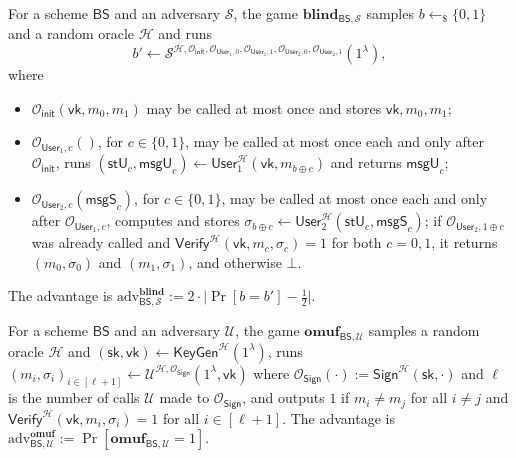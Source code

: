 \documentclass{conjura-conjecture}
\newcommand{\HH}{\mathcal{H}}
\newcommand{\BS}{\mathsf{BS}}
\newcommand{\KeyGen}{\mathsf{KeyGen}}
\newcommand{\Userone}{\mathsf{User}_1}
\newcommand{\Usertwo}{\mathsf{User}_2}
\newcommand{\Sig}{\mathsf{Sign}}
\newcommand{\Ver}{\mathsf{Verify}}
\newcommand{\sky}{\mathsf{sk}}
\newcommand{\vky}{\mathsf{vk}}
\newcommand{\stU}{\mathsf{stU}}
\newcommand{\msgU}{\mathsf{msgU}}
\newcommand{\msgS}{\mathsf{msgS}}
\newcommand{\OSign}{\mathcal{O}_{\mathsf{Sign}}}
\newcommand{\Oinit}{\mathcal{O}_{\mathsf{init}}}
\newcommand{\adv}{\mathrm{adv}}
\begin{document}
\begin{definition}[Blindness]\label{def:blind}
For a scheme $\BS$ and an adversary $\mathcal{S}$, the game
$\mathbf{blind}_{\BS,\mathcal{S}}$ samples $b\leftarrow_{\$}\{0,1\}$ and
a random oracle $\HH$ and runs
\[
  b'\leftarrow\mathcal{S}^{\HH,\Oinit,\mathcal{O}_{\Userone,0},
  \mathcal{O}_{\Userone,1},\mathcal{O}_{\Usertwo,0},
  \mathcal{O}_{\Usertwo,1}}(1^{\lambda}),
\]
where
\begin{itemize}
  \item $\Oinit(\vky,m_{0},m_{1})$ may be called at most once and stores
    $\vky,m_{0},m_{1}$;
  \item $\mathcal{O}_{\Userone,c}()$, for $c\in\{0,1\}$, may be called at
    most once each and only after $\Oinit$, runs
    $(\stU_{c},\msgU_{c})\leftarrow\Userone^{\HH}(\vky,m_{b\oplus c})$
    and returns $\msgU_{c}$;
  \item $\mathcal{O}_{\Usertwo,c}(\msgS_{c})$, for $c\in\{0,1\}$, may be
    called at most once each and only after $\mathcal{O}_{\Userone,c}$,
    computes and stores
    $\sigma_{b\oplus c}\leftarrow\Usertwo^{\HH}(\stU_{c},\msgS_{c})$; if
    $\mathcal{O}_{\Usertwo,1\oplus c}$ was already called and
    $\Ver^{\HH}(\vky,m_{c},\sigma_{c})=1$ for both $c=0,1$, it returns
    $(m_{0},\sigma_{0})$ and $(m_{1},\sigma_{1})$, and otherwise $\bot$.
\end{itemize}
The advantage is
$\adv^{\mathbf{blind}}_{\BS,\mathcal{S}}
 :=2\cdot\bigl|\Pr[b=b']-\tfrac{1}{2}\bigr|$.
\end{definition}

\begin{definition}\label{def:omuf}
For a scheme $\BS$ and an adversary $\mathcal{U}$, the game
$\mathbf{omuf}_{\BS,\mathcal{U}}$ samples a random oracle $\HH$ and
$(\sky,\vky)\leftarrow\KeyGen^{\HH}(1^{\lambda})$, runs
$(m_{i},\sigma_{i})_{i\in[\ell+1]}\leftarrow
\mathcal{U}^{\HH,\OSign}(1^{\lambda},\vky)$ where
$\OSign(\cdot):=\Sig^{\HH}(\sky,\cdot)$ and $\ell$ is the number of
calls $\mathcal{U}$ made to $\OSign$, and outputs $1$ if
$m_{i}\ne m_{j}$ for all $i\ne j$ and
$\Ver^{\HH}(\vky,m_{i},\sigma_{i})=1$ for all $i\in[\ell+1]$. The
advantage is
$\adv^{\mathbf{omuf}}_{\BS,\mathcal{U}}
 :=\Pr[\mathbf{omuf}_{\BS,\mathcal{U}}=1]$.
\end{definition}
\end{document}
